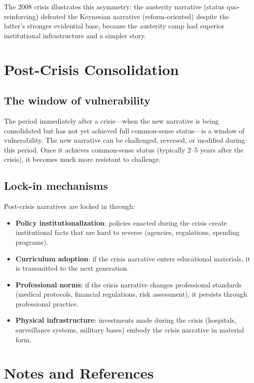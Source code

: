 The 2008 crisis illustrates this asymmetry: the austerity narrative (status quo-reinforcing) defeated the Keynesian narrative (reform-oriented) despite the latter's stronger evidential base, because the austerity camp had superior institutional infrastructure and a simpler story.

\section{Post-Crisis Consolidation}
\label{sec:ch29-consolidation}

\subsection{The window of vulnerability}

The period immediately after a crisis---when the new narrative is being consolidated but has not yet achieved full common-sense status---is a window of vulnerability.
The new narrative can be challenged, reversed, or modified during this period.
Once it achieves common-sense status (typically 2--5 years after the crisis), it becomes much more resistant to challenge.

\subsection{Lock-in mechanisms}

Post-crisis narratives are locked in through:
\begin{itemize}[nosep]
  \item \textbf{Policy institutionalization}: policies enacted during the crisis create institutional facts that are hard to reverse (agencies, regulations, spending programs).
  \item \textbf{Curriculum adoption}: if the crisis narrative enters educational materials, it is transmitted to the next generation.
  \item \textbf{Professional norms}: if the crisis narrative changes professional standards (medical protocols, financial regulations, risk assessment), it persists through professional practice.
  \item \textbf{Physical infrastructure}: investments made during the crisis (hospitals, surveillance systems, military bases) embody the crisis narrative in material form.
\end{itemize}

\section{Notes and References}
\label{sec:ch29-notes}

